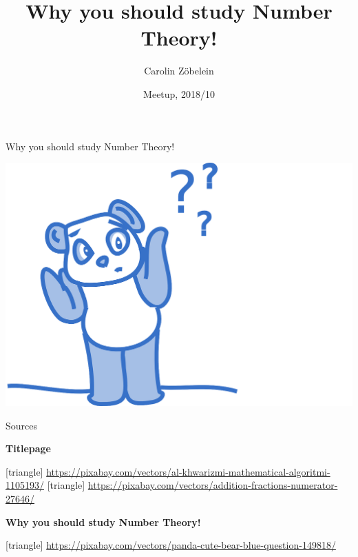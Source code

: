 \documentclass[ucs,10pt]{beamer}
\title[Why you should study Number Theory!]{Why you should study Number Theory!}
\author[Zöbelein]{Carolin Zöbelein}
\institute[\url{https://research.carolin-zoebelein.de}]{Independent mathematical scientist}
\date[2018/10]{Meetup, 2018/10}
\begin{document}
\begin{frame}[plain]
  \titlepage
\end{frame}
\begin{frame}{Why you should study Number Theory!}

	\hspace{3.25cm}
		\includegraphics[scale=0.15]{images/panda-149818_1280.png}
		\label{fig:panda}

\end{frame}
\begin{frame}{Sources}
 
	\textbf{Titlepage}
	\begin{thebibliography}{10}
		[triangle]
		 \url{https://pixabay.com/vectors/al-khwarizmi-mathematical-algoritmi-1105193/}
		[triangle]
		 \url{https://pixabay.com/vectors/addition-fractions-numerator-27646/}				
	\end{thebibliography}

	\vspace{0.3cm}
	\textbf{Why you should study Number Theory!}
	\begin{thebibliography}{10}
		[triangle]
		\url{https://pixabay.com/vectors/panda-cute-bear-blue-question-149818/}
	\end{thebibliography}

\end{frame}
\end{document}
